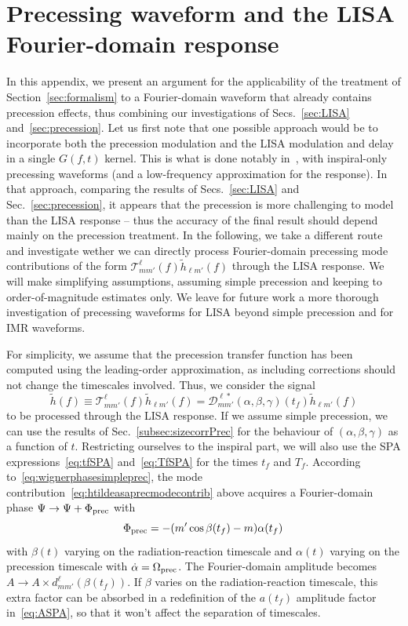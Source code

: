 \documentclass[aps,showpacs,twocolumn,
prd,superscriptaddress,nofootinbib]{revtex4-1}
\newcommand{\be}{\begin{equation}}
\newcommand{\ee}{\end{equation}}
\newcommand\calT{{\mathcal{T}}}
\newcommand\calD{{\mathcal{D}}}
\newcommand{\tf}{t_{f}}
\newcommand{\Tf}{T_{f}}
\begin{document}
\section{Precessing waveform and the LISA Fourier-domain response}
\label{app:precLISA}

In this appendix, we present an argument for the applicability of the treatment of Section~\ref{sec:formalism} to a Fourier-domain waveform that already contains precession effects, thus combining our investigations of Secs.~\ref{sec:LISA} and~\ref{sec:precession}. Let us first note that one possible approach would be to incorporate both the precession modulation and the LISA modulation and delay in a single $G(f,t)$ kernel. This is what is done notably in~\cite{Klein+15}, with inspiral-only precessing waveforms (and a low-frequency approximation for the response). In that approach, comparing the results of Secs.~\ref{sec:LISA} and Sec.~\ref{sec:precession}, it appears that the precession is more challenging to model than the LISA response -- thus the accuracy of the final result should depend mainly on the precession treatment. In the following, we take a different route and investigate wether we can directly process Fourier-domain precessing mode contributions of the form $\calT^{\ell}_{m m'}(f) \tilde{h}_{\ell m'}(f)$ through the LISA response. We will make simplifying assumptions, assuming simple precession and keeping to order-of-magnitude estimates only. We leave for future work a more thorough investigation of precessing waveforms for LISA beyond simple precession and for IMR waveforms.

For simplicity, we assume that the precession transfer function has been computed using the leading-order approximation, as including corrections should not change the timescales involved. Thus, we consider the signal
\be\label{eq:htildeasaprecmodecontrib}
	\tilde{h} (f) \equiv \calT^{\ell}_{m m'}(f) \tilde{h}_{\ell m'}(f) = \calD^{\ell *}_{m m'}(\alpha, \beta, \gamma)(\tf) \tilde{h}_{\ell m'}(f)
\ee
to be processed through the LISA response. If we assume simple precession, we can use the results of Sec.~\ref{subsec:sizecorrPrec} for the behaviour of $(\alpha, \beta, \gamma)$ as a function of $t$. Restricting ourselves to the inspiral part, we will also use the SPA expressions~\eqref{eq:tfSPA} and~\eqref{eq:TfSPA} for the times $\tf$ and $\Tf$. According to~\eqref{eq:wignerphasesimpleprec}, the mode contribution~\eqref{eq:htildeasaprecmodecontrib} above acquires a Fourier-domain phase $\Psi \rightarrow \Psi + \Phi_{\rm prec}$ with
\be\label{eq:additionalPhiprec}
	\Phi_{\rm prec} = -(m' \cos \beta(\tf) - m) \alpha(\tf) \,
\ee
with $\beta(t)$ varying on the radiation-reaction timescale and $\alpha(t)$ varying on the precession timescale with $\dot{\alpha} = \Omega_{\rm prec}$. The Fourier-domain amplitude becomes $A\rightarrow A \times d^{\ell}_{mm'} (\beta(\tf))$. If $\beta$ varies on the radiation-reaction timescale, this extra factor can be absorbed in a redefinition of the $a(\tf)$ amplitude factor in~\eqref{eq:ASPA}, so that it won't affect the separation of timescales.
\end{document}
